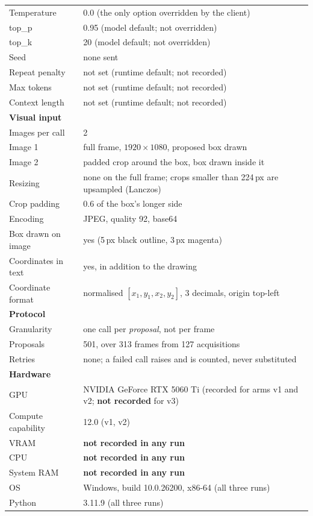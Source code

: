 \begin{table}[t]
\begin{tabular}{ll}
Temperature      & 0.0 (the only option overridden by the client) \\
top\_p           & 0.95 (model default; not overridden) \\
top\_k           & 20 (model default; not overridden) \\
Seed             & none sent \\
Repeat penalty   & not set (runtime default; not recorded) \\
Max tokens       & not set (runtime default; not recorded) \\
Context length   & not set (runtime default; not recorded) \\
\midrule
\multicolumn{2}{l}{\textbf{Visual input}} \\
Images per call  & 2 \\
Image 1          & full frame, $1920\times1080$, proposed box drawn \\
Image 2          & padded crop around the box, box drawn inside it \\
Resizing         & none on the full frame; crops smaller than 224\,px are
                   upsampled (Lanczos) \\
Crop padding     & 0.6 of the box's longer side \\
Encoding         & JPEG, quality 92, base64 \\
Box drawn on image & yes (5\,px black outline, 3\,px magenta) \\
Coordinates in text & yes, in addition to the drawing \\
Coordinate format & normalised $[x_1,y_1,x_2,y_2]$, 3 decimals, origin top-left \\
\midrule
\multicolumn{2}{l}{\textbf{Protocol}} \\
Granularity      & one call per \emph{proposal}, not per frame \\
Proposals        & 501, over 313 frames from 127 acquisitions \\
Retries          & none; a failed call raises and is counted, never substituted \\
\midrule
\multicolumn{2}{l}{\textbf{Hardware}} \\
GPU              & NVIDIA GeForce RTX 5060 Ti (recorded for arms v1 and v2;
                   \textbf{not recorded} for v3) \\
Compute capability & 12.0 (v1, v2) \\
VRAM             & \textbf{not recorded in any run} \\
CPU              & \textbf{not recorded in any run} \\
System RAM       & \textbf{not recorded in any run} \\
OS               & Windows, build 10.0.26200, x86-64 (all three runs) \\
Python           & 3.11.9 (all three runs) \\
\bottomrule
\end{tabular}
\end{table}

